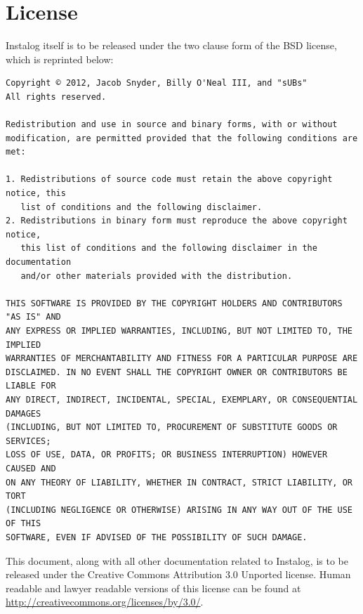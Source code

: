 \documentclass[letterpaper,12pt]{article}
\begin{document}
\newpage



{} 


\newpage



\appendix
\section{License} \label{license}
Instalog itself is to be released under the two clause form of the BSD license,
which is reprinted below:

\begin{verbatim}
Copyright © 2012, Jacob Snyder, Billy O'Neal III, and "sUBs"
All rights reserved.

Redistribution and use in source and binary forms, with or without
modification, are permitted provided that the following conditions are met: 

1. Redistributions of source code must retain the above copyright notice, this
   list of conditions and the following disclaimer. 
2. Redistributions in binary form must reproduce the above copyright notice,
   this list of conditions and the following disclaimer in the documentation
   and/or other materials provided with the distribution. 

THIS SOFTWARE IS PROVIDED BY THE COPYRIGHT HOLDERS AND CONTRIBUTORS "AS IS" AND
ANY EXPRESS OR IMPLIED WARRANTIES, INCLUDING, BUT NOT LIMITED TO, THE IMPLIED
WARRANTIES OF MERCHANTABILITY AND FITNESS FOR A PARTICULAR PURPOSE ARE
DISCLAIMED. IN NO EVENT SHALL THE COPYRIGHT OWNER OR CONTRIBUTORS BE LIABLE FOR
ANY DIRECT, INDIRECT, INCIDENTAL, SPECIAL, EXEMPLARY, OR CONSEQUENTIAL DAMAGES
(INCLUDING, BUT NOT LIMITED TO, PROCUREMENT OF SUBSTITUTE GOODS OR SERVICES;
LOSS OF USE, DATA, OR PROFITS; OR BUSINESS INTERRUPTION) HOWEVER CAUSED AND
ON ANY THEORY OF LIABILITY, WHETHER IN CONTRACT, STRICT LIABILITY, OR TORT
(INCLUDING NEGLIGENCE OR OTHERWISE) ARISING IN ANY WAY OUT OF THE USE OF THIS
SOFTWARE, EVEN IF ADVISED OF THE POSSIBILITY OF SUCH DAMAGE.
\end{verbatim}

This document, along with all other documentation related to Instalog,  is to be
released under the Creative Commons Attribution 3.0 Unported license. Human
readable and lawyer readable versions of this license can be found at
\url{http://creativecommons.org/licenses/by/3.0/}.

\newpage
\end{document}
